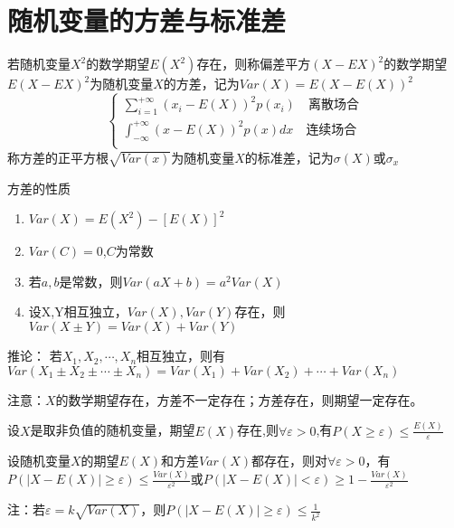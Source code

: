 \section{随机变量的方差与标准差}
\begin{definition}[方差与标准差的定义]
    若随机变量$X^2$的数学期望$E(X^2)$存在，则称偏差平方$(X-EX)^2$的数学期望$E(X-EX)^2$为随机变量$X$的方差，记为$Var(X) = E( X - E(X))^2 $
    $$\left\{ \begin{gathered}
            \sum\limits_{i = 1}^{ + \infty } (x_i - E(X))^2 {p(x_i)} \quad \text{离散场合}\\
            \int_{ - \infty }^{ + \infty } (x - E(X))^2 p(x)dx \quad \text{连续场合}\\
        \end{gathered}  \right.$$
    称方差的正平方根$\sqrt{Var(x)}$为随机变量$X$的标准差，记为$\sigma(X)$或$\sigma_x$

\end{definition}

\begin{property}
    方差的性质
    \begin{enumerate}
        \item $Var(X)=E(X^2) - [E(X)]^2$
        \item $Var(C)=0$,$C$为常数
        \item 若$a,b$是常数，则$Var(aX+b)=a^2Var(X)$
        \item 设X,Y相互独立，$Var(X),Var(Y)$存在，则$Var(X \pm Y)=Var(X)+Var(Y)$
    \end{enumerate}
\end{property}

推论：
若${X_1},{X_2}, \cdots ,{X_n}$相互独立，则有$Var({X_1} \pm {X_2} \pm  \cdots  \pm {X_n}) = Var({X_1}) + Var({X_2}) +  \cdots  + Var({X_n})$

注意：$X$的数学期望存在，方差不一定存在；方差存在，则期望一定存在。


\begin{theorem}[马尔可夫不等式]
    设$X$是取非负值的随机变量，期望$E(X)$存在,则$\forall \varepsilon  > 0$,有$P(X \ge \varepsilon ) \le \frac{{E(X)}}{\varepsilon }$
\end{theorem}

\begin{theorem}[切比雪夫不等式]
    设随机变量$X$的期望$E(X)$和方差$Var(X)$都存在，则对$\forall \varepsilon  > 0$，有$P(\left| {X - E(X)} \right| \ge \varepsilon ) \le \frac{{Var(X)}}{{{\varepsilon ^2}}}$或$P(\left| {X - E(X)} \right| < \varepsilon ) \ge 1 - \frac{{Var(X)}}{{{\varepsilon ^2}}}$
\end{theorem}
注：若$\varepsilon=k \sqrt{Var(X)}$，则$P(\left| {X - E(X)} \right| \ge \varepsilon ) \le \frac{1}{k^2}$

